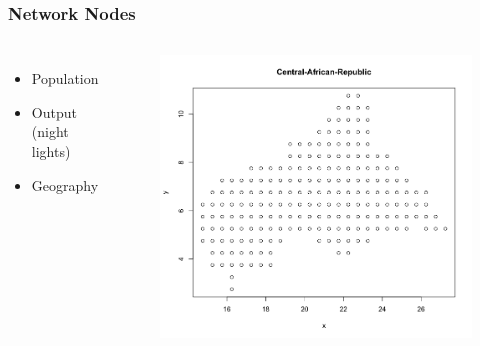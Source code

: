 \documentclass[]{beamer}   	%
\begin{document}
\begin{frame}
  \frametitle{Network Nodes}
  \begin{columns}
      \begin{itemize}
        \item Population
        \item Output (night lights)
        \item Geography
      \end{itemize}
  \begin{figure}
    \centering
    \includegraphics[width=\textwidth, trim={1cm 1.5cm 1cm 1cm},clip]{../../Write/Present/Images/CAE_nodes.png}
  \end{figure}
  \end{columns}
\end{frame}
\end{document}
